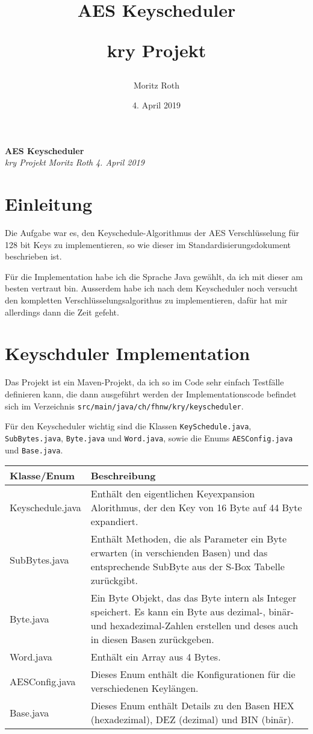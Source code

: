 \documentclass[12pt, letterpaper]{article}
\title{AES Keyscheduler \\
\begin{large}
kry Projekt
\end{large} }
\author{Moritz Roth}
\date{4. April 2019}
\newcommand{\code}[1]{\texttt{#1}}
\begin{document}
\begin{titlepage}
  \centering
  \vfill
  \LARGE\textbf{AES Keyscheduler}\\
  \Large\textit{kry Projekt}
  \vfill
  \large\textit{Moritz Roth}
  \vfill
  \large\textit{4. April 2019}
  \vfill
\end{titlepage}

\section*{Einleitung}
Die Aufgabe war es, den Keyschedule-Algorithmus der AES Verschlüsselung für 128 bit Keys zu implementieren, so wie dieser im Standardisierungsdokument beschrieben ist.

Für die Implementation habe ich die Sprache Java gewählt, da ich mit dieser am besten vertraut bin. Ausserdem habe ich nach dem Keyscheduler noch versucht den kompletten Verschlüsselungsalgorithus zu implementieren, dafür hat mir allerdings dann die Zeit gefeht.

\section*{Keyschduler Implementation}

Das Projekt ist ein Maven-Projekt, da ich so im Code sehr einfach Testfälle definieren kann, die dann ausgeführt werden der Implementationscode befindet sich im Verzeichnis \code{src/main/java/ch/fhnw/kry/keyscheduler}.


Für den Keyscheduler wichtig sind die Klassen \code{KeySchedule.java}, \code{SubBytes.java}, \code{Byte.java} und \code{Word.java}, sowie die Enums \code{AESConfig.java} und \code{Base.java}.

\begin{center}
  {\tablinesep=10pt\begin{tabular}{l|p{10cm}}
  Klasse/Enum & Beschreibung \\ \hline
  Keyschedule.java & Enthält den eigentlichen Keyexpansion Alorithmus, der den Key von 16 Byte auf 44 Byte expandiert. \\
  SubBytes.java & Enthält Methoden, die als Parameter ein Byte erwarten (in verschienden Basen) und das entsprechende SubByte aus der S-Box Tabelle zurückgibt. \\
  Byte.java & Ein Byte Objekt, das das Byte intern als Integer speichert. Es kann ein Byte aus dezimal-, binär- und hexadezimal-Zahlen erstellen und deses auch in diesen Basen zurückgeben. \\
  Word.java & Enthält ein Array aus 4 Bytes. \\
  AESConfig.java & Dieses Enum enthält die Konfigurationen für die verschiedenen Keylängen. \\
  Base.java & Dieses Enum enthält Details zu den Basen HEX (hexadezimal), DEZ (dezimal) und BIN (binär).
  \end{tabular}}
\end{center}
\end{document}

